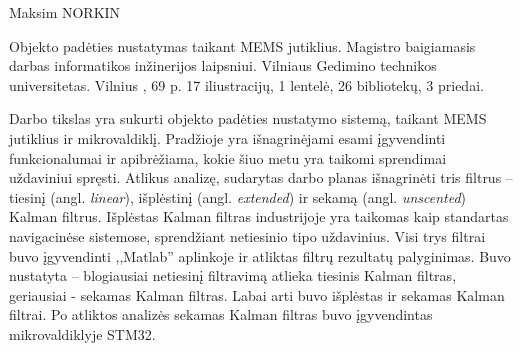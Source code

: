 Maksim NORKIN

Objekto padėties nustatymas taikant MEMS jutiklius. 
Magistro baigiamasis darbas informatikos inžinerijos laipsniui. 
Vilniaus Gedimino technikos universitetas.
Vilnius \the\year, 69 p. 17 iliustracijų, 1 lentelė, 26 bibliotekų, 3 priedai.

Darbo tikslas yra sukurti objekto padėties nustatymo sistemą, taikant MEMS jutiklius ir mikrovaldiklį.
Pradžioje yra išnagrinėjami esami įgyvendinti funkcionalumai ir apibrėžiama, kokie šiuo metu yra taikomi sprendimai uždaviniui spręsti.
Atlikus analizę, sudarytas darbo planas išnagrinėti tris filtrus -- tiesinį (angl. \textit{linear}), išplėstinį (angl. \textit{extended}) ir sekamą (angl. \textit{unscented}) Kalman filtrus.
Išplėstas Kalman filtras industrijoje yra taikomas kaip standartas navigacinėse sistemose, sprendžiant netiesinio tipo uždavinius.
Visi trys filtrai buvo įgyvendinti ,,Matlab'' aplinkoje ir atliktas filtrų rezultatų palyginimas.
Buvo nustatyta -- blogiausiai netiesinį filtravimą atlieka tiesinis Kalman filtras, geriausiai - sekamas Kalman filtras.
Labai arti buvo išplėstas ir sekamas Kalman filtrai.
Po atliktos analizės sekamas Kalman filtras buvo įgyvendintas mikrovaldiklyje STM32.

